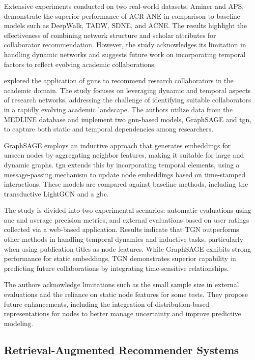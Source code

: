 Extensive experiments conducted on two real-world datasets, Aminer and APS, demonstrate the superior performance of ACR-ANE in comparison to baseline models such as DeepWalk, TADW, SDNE, and ACNE.
The results highlight the effectiveness of combining network structure and scholar attributes for collaborator recommendation.
However, the study acknowledges its limitation in handling dynamic networks and suggests future work on incorporating temporal factors to reflect evolving academic collaborations.


\textcite{Zhu2022} explored the application of \glspl{gnn} to recommend research collaborators in the academic domain.
The study focuses on leveraging dynamic and temporal aspects of research networks, addressing the challenge of identifying suitable collaborators in a rapidly evolving academic landscape.
The authors utilize data from the MEDLINE database and implement two \gls{gnn}-based models, GraphSAGE and \gls{tgn}, to capture both static and temporal dependencies among researchers.

GraphSAGE employs an inductive approach that generates embeddings for unseen nodes by aggregating neighbor features, making it suitable for large and dynamic graphs.
\gls{tgn} extends this by incorporating temporal elements, using a message-passing mechanism to update node embeddings based on time-stamped interactions.
These models are compared against baseline methods, including the transductive LightGCN and a \gls{gbc}.

The study is divided into two experimental scenarios: automatic evaluations using \gls{auc} and average precision metrics, and external evaluations based on user ratings collected via a web-based application.
Results indicate that TGN outperforms other methods in handling temporal dynamics and inductive tasks, particularly when using publication titles as node features. While GraphSAGE exhibits strong performance for static embeddings, TGN demonstrates superior capability in predicting future collaborations by integrating time-sensitive relationships.

The authors acknowledge limitations such as the small sample size in external evaluations and the reliance on static node features for some tests.
They propose future enhancements, including the integration of distribution-based representations for nodes to better manage uncertainty and improve predictive modeling.

\subsection*{Retrieval-Augmented Recommender Systems}\label{sec:retrieval-augmented-recommender-systems-in-research-field}

